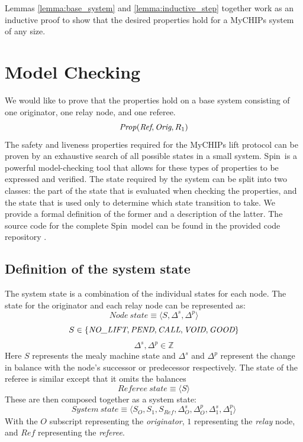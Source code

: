 \documentclass[runningheads]{llncs}
\newcommand{\nolift}{\emph{NO\_LIFT}}
\newcommand{\pend}{\emph{PEND}}
\newcommand{\call}{\emph{CALL}}
\newcommand{\void}{\emph{VOID}}
\newcommand{\good}{\emph{GOOD}}
\newcommand{\spin}{Spin}
\newcommand{\coderepository}{provided code repository \cite{Storey_Extending_Model_Checking_2023}}
\newif\ifcomments
\newif\ifkylecomments
\newcommand{\egm}[1]{\ifcomments\textcolor{orange}{egm: #1}\fi}
\newcommand{\krs}[1]{\ifkylecomments\textcolor{blue}{krs: #1}\fi}
\begin{document}
Lemmas \ref{lemma:base_system} and \ref{lemma:inductive_step} together work as an inductive proof to show that the desired properties hold for a MyCHIPs system of any size.


\section{Model Checking} \label{chap:model_checking_results}
We would like to prove that the properties hold on a base system consisting of one originator, one relay node, and one referee.
$$
\mathit{Prop}(\emph{Ref}, \emph{Orig}, R_1)
$$
The safety and liveness properties required for the MyCHIPs lift protocol can be proven by an exhaustive search of all possible states in a small system. \spin\ is a powerful model-checking tool that allows for these types of properties to be expressed and verified. The state required by the system can be split into two classes: the part of the state that is evaluated when checking the properties, and the state that is used only to determine which state transition to take. We provide a formal definition of the former and a description of the latter. The source code for the complete \spin\ model can be found in the \coderepository.
\krs{Added a new command to make this consistent. \egm{Move the reference to the repository into a citation. Also, be consistent with how Spin is presented. Spin, spin, SPIN, etc. Pick one and be consistent.}}

\subsection{Definition of the system state}\label{sec:statedef}
The system state is a combination of the individual states for each node. The state for the originator and each relay node can be represented as:
$$\mathit{Node~state} \equiv \langle S, \Delta^s, \Delta^p \rangle$$
$$
S \in \{\nolift, \pend, \call, \void, \good\}
$$
$$
\Delta^s, \Delta^p \in \mathds{Z}
$$
Here $S$ represents the mealy machine state and $\Delta^s$ and $\Delta^p$ represent the change in balance with the node's successor or predecessor respectively.
The state of the referee is similar except that it omits the balances
$$\mathit{Referee~state} \equiv \langle S \rangle$$
These are then composed together as a system state:
$$\mathit{System~state} \equiv \langle S_O, S_1, S_{\mathit{Ref}}, \Delta^s_O, \Delta^p_O, \Delta^s_1, \Delta^p_1 \rangle$$
With the $O$ subscript representing the \emph{originator}, $1$ representing the \emph{relay} node, and $\mathit{Ref}$ representing the \emph{referee}.
\end{document}
